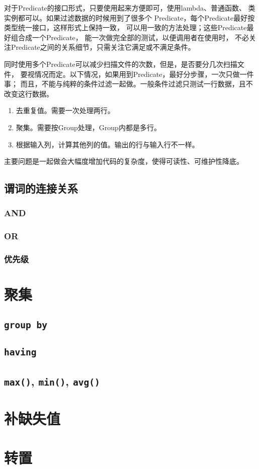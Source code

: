 \documentclass[11pt]{article}
\newcommand{\id}[1]{\texttt{#1}}
\newcommand{\kw}[1]{\texttt{\textbf{#1}}}
\begin{document}
对于Predicate的接口形式，只要使用起来方便即可，使用lambda、普通函数、
类实例都可以。如果过滤数据的时候用到了很多个
Predicate，每个Predicate最好按类型统一接口，这样形式上保持一致，
可以用一致的方法处理；这些Predicate最好组合成一个Predicate，
能一次做完全部的测试，以便调用者在使用时，
不必关注Predicate之间的关系细节，只需关注它满足或不满足条件。

同时使用多个Predicate可以减少扫描文件的次数，但是，是否要分几次扫描文件，
要视情况而定。以下情况，如果用到Predicate，最好分步骤，一次只做一件事；
而且，不能与纯粹的条件过滤一起做。一般条件过滤只测试一行数据，且不改变这行数据。

\begin{enumerate}
  \item 去重复值。需要一次处理两行。
  \item 聚集。需要按Group处理，Group内都是多行。
  \item 根据输入列，计算其他列的值。输出的行与输入行不一样。
\end{enumerate}

主要问题是一起做会大幅度增加代码的复杂度，使得可读性、可维护性降底。


\subsection{谓词的连接关系}
\subsubsection{AND}
\subsubsection{OR}
\subsubsection{优先级}
\section{聚集}
\subsection{\kw{group by}}
\subsection{\kw{having}}
\subsection{\id{max()}, \id{min()}, \id{avg()}}
\section{补缺失值}

\section{转置}
\end{document}
